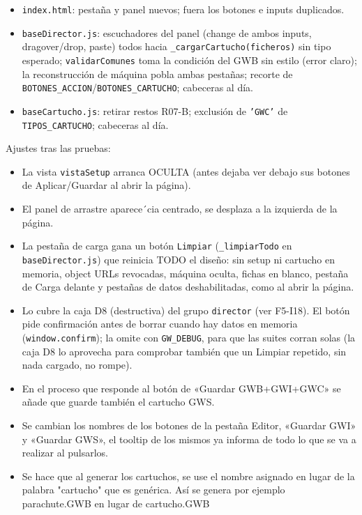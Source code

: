 \begin{itemize}
	\item \texttt{index.html}: pestaña y panel nuevos; fuera los botones e
	inputs duplicados.
	\item \texttt{baseDirector.js}: escuchadores del panel (change de ambos
	inputs, dragover/drop, paste) todos hacia
	\texttt{\_cargarCartucho(ficheros)} sin tipo esperado;
	\texttt{validarComunes} toma la condición del GWB sin estilo (error
	claro); la reconstrucción de máquina pobla ambas pestañas; recorte de
	\texttt{BOTONES\_ACCION}/\texttt{BOTONES\_CARTUCHO}; cabeceras al día.
	\item \texttt{baseCartucho.js}: retirar restos R07-B; exclusión de
	\texttt{'GWC'} de \texttt{TIPOS\_CARTUCHO}; cabeceras al día.
\end{itemize}

Ajustes tras las pruebas: 
\begin{itemize}
	\item La vista \texttt{vistaSetup} arranca OCULTA (antes dejaba ver debajo sus botones de Aplicar/Guardar al abrir la página).
	\item El panel de arrastre aparece´cia centrado, se desplaza a la  izquierda de la página.
	\item La pestaña de carga gana un botón \texttt{Limpiar} (\texttt{\_limpiarTodo} en \texttt{baseDirector.js}) que reinicia TODO el diseño: sin setup ni cartucho en memoria, object URLs revocadas, máquina oculta, fichas en blanco, pestaña de Carga delante y pestañas de datos deshabilitadas, como al abrir la página.
	\item Lo cubre la caja D8 (destructiva) del grupo \texttt{director} (ver F5-I18). El botón pide confirmación antes de borrar cuando hay datos en memoria (\texttt{window.confirm}); la omite con \texttt{GW\_DEBUG}, para que las suites corran solas (la caja D8 lo aprovecha para comprobar también que un Limpiar repetido, sin nada cargado, no rompe).
	\item En el proceso que responde al botón de «Guardar GWB+GWI+GWC» se añade que  guarde también el cartucho GWS.
	\item Se cambian los nombres de los botones de la pestaña Editor, «Guardar GWI» y «Guardar GWS», el tooltip de los mismos ya informa de todo lo que se va a realizar al pulsarlos.
	\item Se hace que al generar los cartuchos, se use el nombre asignado en lugar de la palabra "cartucho" que es genérica. Así se genera por ejemplo parachute.GWB en lugar de cartucho.GWB
\end{itemize}
